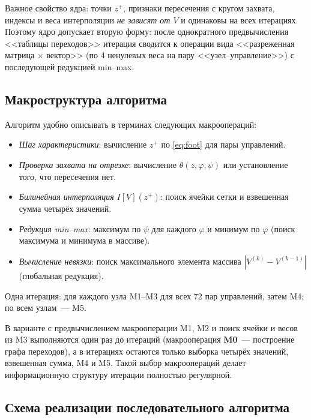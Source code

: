 \documentclass[14pt,a4paper]{extarticle}
\begin{document}
Важное свойство ядра: точки $z^{+}$, признаки пересечения с кругом
захвата, индексы и веса интерполяции \emph{не зависят от $V$} и
одинаковы на всех итерациях. Поэтому ядро допускает вторую форму: после
однократного предвычисления <<таблицы переходов>> итерация сводится к
операции вида <<разреженная матрица $\times$ вектор>> (по 4 ненулевых
веса на пару <<узел--управление>>) с последующей редукцией min--max.

\subsection{Макроструктура алгоритма}

Алгоритм удобно описывать в терминах следующих макроопераций:
\begin{itemize}
	\item[\textbf{M1.}] \emph{Шаг характеристики}: вычисление $z^{+}$ по
	\eqref{eq:foot} для пары управлений.
	\item[\textbf{M2.}] \emph{Проверка захвата на отрезке}: вычисление
	$\theta(z,\varphi,\psi)$ или установление того, что пересечения нет.
	\item[\textbf{M3.}] \emph{Билинейная интерполяция} $I[V](z^{+})$:
	поиск ячейки сетки и взвешенная сумма четырёх значений.
	\item[\textbf{M4.}] \emph{Редукция min--max}: максимум по $\psi$
	для каждого $\varphi$ и минимум по $\varphi$ (поиск максимума и
	минимума в массиве).
	\item[\textbf{M5.}] \emph{Вычисление невязки}: поиск максимального
	элемента массива $|V^{(k)}-V^{(k-1)}|$ (глобальная редукция).
\end{itemize}
Одна итерация: для каждого узла M1--M3 для всех 72 пар управлений, затем
M4; по всем узлам~--- M5.

В варианте с предвычислением макрооперации M1, M2 и поиск ячейки и
весов из M3 выполняются один раз до итераций (макрооперация
\textbf{M0}~--- построение графа переходов), а в итерациях остаются
только выборка четырёх значений, взвешенная сумма, M4 и M5. Такой выбор
макроопераций делает информационную структуру итерации полностью
регулярной.

\subsection{Схема реализации последовательного алгоритма}
\end{document}
